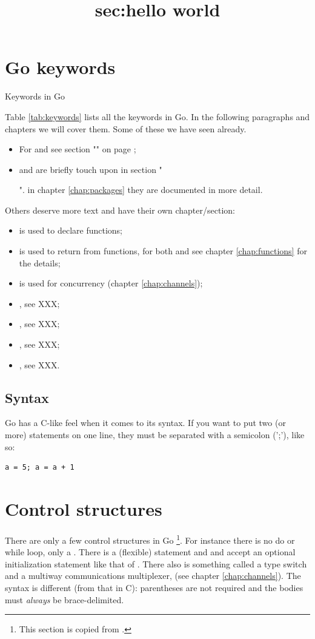\section{Go keywords}
\begin{table}[H]
\begin{center}
\caption{Keywords in Go}
\label{tab:keywords}

\end{center}
\end{table}
Table \ref{tab:keywords} lists all the keywords in Go. 
In the following paragraphs and chapters we will cover them. Some
of these we have seen already.
\begin{itemize}
\item For  and  see section "" on 
page \pageref{sec:vars};
\item {} and  are briefly touch upon in section "\title{sec:hello
world}". in chapter \ref{chap:packages} they are documented in more detail.
\end{itemize}
Others deserve more text and have their own chapter/section:
\begin{itemize}
\item {} is used to declare functions;
\item {} is used to return from functions, for both 
and  see chapter \ref{chap:functions} for the details;
\item {} is used for concurrency (chapter \ref{chap:channels});
\item {}, see XXX;
\item {}, see XXX;
\item {}, see XXX;
\item {}, see XXX.
\end{itemize}

\subsection{Syntax}
Go has a C-like feel when it comes to its syntax. 
If you want to put two (or more) statements on one line, they must be
separated with a semicolon (';'), like so:
\begin{lstlisting}
a = 5; a = a + 1
\end{lstlisting}
\section{Control structures}
There are only a few control structures in 
Go \footnote{This section is copied from \cite{effective_go}.}.
For instance there is no do or while loop, only a 
. There is a (flexible)  statement and  and
 accept an
optional initialization statement like that of . There also is
something called a type switch and a multiway communications
multiplexer,  (see chapter \ref{chap:channels}). The syntax is 
different (from that in C): parentheses
are not required and the bodies must \emph{always} be brace-delimited.

